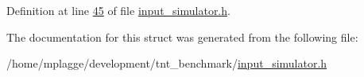 Definition at line \hyperlink{input__simulator_8h_source_l00045}{45} of file \hyperlink{input__simulator_8h_source}{input\+\_\+simulator.\+h}.



The documentation for this struct was generated from the following file\+:\begin{DoxyCompactItemize}
\item 
/home/mplagge/development/tnt\+\_\+benchmark/\hyperlink{input__simulator_8h}{input\+\_\+simulator.\+h}\end{DoxyCompactItemize}
